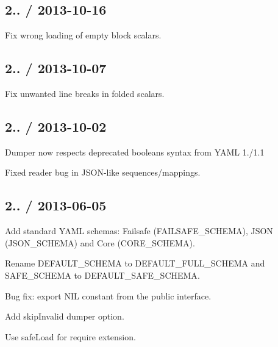 \subsection*{2.. / 2013-\/10-\/16 }


\begin{DoxyItemize}
\item Fix wrong loading of empty block scalars.
\end{DoxyItemize}

\subsection*{2.. / 2013-\/10-\/07 }


\begin{DoxyItemize}
\item Fix unwanted line breaks in folded scalars.
\end{DoxyItemize}

\subsection*{2.. / 2013-\/10-\/02 }


\begin{DoxyItemize}
\item Dumper now respects deprecated booleans syntax from Y\+A\+M\+L 1./1.1
\item Fixed reader bug in J\+S\+O\+N-\/like sequences/mappings.
\end{DoxyItemize}

\subsection*{2.. / 2013-\/06-\/05 }


\begin{DoxyItemize}
\item Add standard Y\+A\+M\+L schemas\+: Failsafe ({\ttfamily F\+A\+I\+L\+S\+A\+F\+E\+\_\+\+S\+C\+H\+E\+M\+A}), J\+S\+O\+N ({\ttfamily J\+S\+O\+N\+\_\+\+S\+C\+H\+E\+M\+A}) and Core ({\ttfamily C\+O\+R\+E\+\_\+\+S\+C\+H\+E\+M\+A}).
\item Rename {\ttfamily D\+E\+F\+A\+U\+L\+T\+\_\+\+S\+C\+H\+E\+M\+A} to {\ttfamily D\+E\+F\+A\+U\+L\+T\+\_\+\+F\+U\+L\+L\+\_\+\+S\+C\+H\+E\+M\+A} and {\ttfamily S\+A\+F\+E\+\_\+\+S\+C\+H\+E\+M\+A} to {\ttfamily D\+E\+F\+A\+U\+L\+T\+\_\+\+S\+A\+F\+E\+\_\+\+S\+C\+H\+E\+M\+A}.
\item Bug fix\+: export {\ttfamily N\+I\+L} constant from the public interface.
\item Add {\ttfamily skip\+Invalid} dumper option.
\item Use {\ttfamily safe\+Load} for {\ttfamily require} extension.
\end{DoxyItemize}

